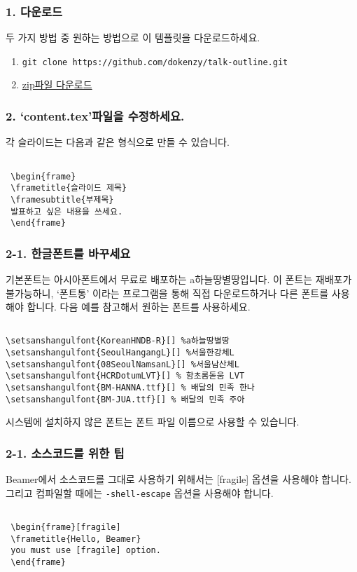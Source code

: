 \begin{frame}[fragile]
\frametitle{1. 다운로드}
두 가지 방법 중 원하는 방법으로 이 템플릿을 다운로드하세요.
\begin{enumerate}
\item \lstinline|git clone https://github.com/dokenzy/talk-outline.git|
\item \href{https://github.com/dokenzy/talk-outline/archive/master.zip}{zip파일 다운로드}
\end{enumerate}
\end{frame}


\begin{frame}[fragile]
\frametitle{2. `content.tex'파일을 수정하세요.}
각 슬라이드는 다음과 같은 형식으로 만들 수 있습니다.
\begin{lstlisting}

 \begin{frame}
 \frametitle{슬라이드 제목}
 \framesubtitle{부제목}
 발표하고 싶은 내용을 쓰세요.
 \end{frame}

\end{lstlisting}
\end{frame}


\begin{frame}[fragile]
\frametitle{2-1. 한글폰트를 바꾸세요}
기본폰트는 아시아폰트에서 무료로 배포하는 a하늘땅별땅입니다. 이 폰트는 재배포가 불가능하니, `폰트통' 이라는 프로그램을 통해 직접 다운로드하거나 다른 폰트를 사용해야 합니다. 다음 예를 참고해서 원하는 폰트를 사용하세요.
\begin{lstlisting}

\setsanshangulfont{KoreanHNDB-R}[] %a하늘땅별땅
\setsanshangulfont{SeoulHangangL}[] %서울한강체L
\setsanshangulfont{08SeoulNamsanL}[] %서울남산체L
\setsanshangulfont{HCRDotumLVT}[] % 함초롬돋움 LVT
\setsanshangulfont{BM-HANNA.ttf}[] % 배달의 민족 한나
\setsanshangulfont{BM-JUA.ttf}[] % 배달의 민족 주아

\end{lstlisting}
시스템에 설치하지 않은 폰트는 폰트 파일 이름으로 사용할 수 있습니다.
\end{frame}


\begin{frame}[fragile]
\frametitle{2-1. 소스코드를 위한 팁}
Beamer에서 소스코드를 그대로 사용하기 위해서는 [fragile] 옵션을 사용해야 합니다. 그리고 컴파일할 때에는 \lstinline|-shell-escape| 옵션을 사용해야 합니다.
\begin{lstlisting}

 \begin{frame}[fragile]
 \frametitle{Hello, Beamer}
 you must use [fragile] option.
 \end{frame}

\end{lstlisting}
\end{frame}


